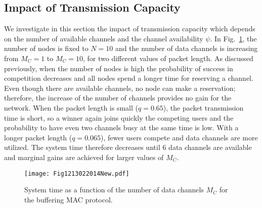 \documentclass[12pt,journal,oneside,onecolumn]{IEEEtran}
\begin{document}
\subsection{Impact of Transmission Capacity}
\label{sec:res_tx_cap}

We investigate in this section the impact of transmission capacity which depends on the number of available
channels and the channel availability $\psi$.
In Fig.~\ref{Fig010203112013}, the number of nodes is fixed 
to $N=10$ and the number of data channels is increasing 
from $M_C=1$ to $M_C=10$, for two different values of packet length. 
As discussed previously, when the number of nodes is high the probability of success in competition decreases and
all nodes spend a longer time for reserving a channel. Even though there 
are available channels, no node can make a reservation; 
therefore, the increase of the number of channels provides no 
gain for the network. When the packet length is small ($q=0.65$), 
the packet transmission time is short, so a winner again joins quickly 
the competing users and the probability to have even two channels 
busy at the same time is low.  
With a longer packet length ($q=0.065$), fewer users compete and data channels are more utilized. The
system time therefore decreases until 6 data channels are available and marginal gains are achieved
for larger values of $M_C$.
\begin{figure}\texttt{[image: Fig1213022014New.pdf]}\caption{System time as a function of the number of data channels $M_C$ for the buffering MAC protocol.}\label{Fig010203112013}\end{figure}
\end{document}
